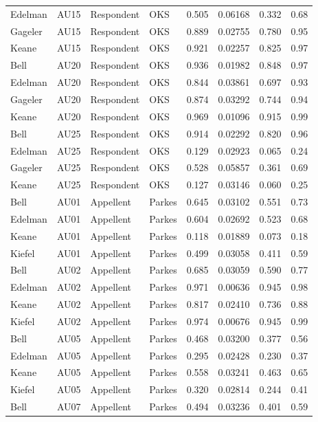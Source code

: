 \documentclass{monashthesis}
\begin{document}
\begin{center}
\begin{longtable}{llllllll}
Edelman & AU15 & Respondent & OKS & 0.505 & 0.06168 & 0.332 & 0.68 \\
Gageler & AU15 & Respondent & OKS & 0.889 & 0.02755 & 0.780 & 0.95 \\
Keane & AU15 & Respondent & OKS & 0.921 & 0.02257 & 0.825 & 0.97 \\
Bell & AU20 & Respondent & OKS & 0.936 & 0.01982 & 0.848 & 0.97 \\
Edelman & AU20 & Respondent & OKS & 0.844 & 0.03861 & 0.697 & 0.93 \\
Gageler & AU20 & Respondent & OKS & 0.874 & 0.03292 & 0.744 & 0.94 \\
Keane & AU20 & Respondent & OKS & 0.969 & 0.01096 & 0.915 & 0.99 \\
Bell & AU25 & Respondent & OKS & 0.914 & 0.02292 & 0.820 & 0.96 \\
Edelman & AU25 & Respondent & OKS & 0.129 & 0.02923 & 0.065 & 0.24 \\
Gageler & AU25 & Respondent & OKS & 0.528 & 0.05857 & 0.361 & 0.69 \\
Keane & AU25 & Respondent & OKS & 0.127 & 0.03146 & 0.060 & 0.25 \\
Bell & AU01 & Appellent & Parkes & 0.645 & 0.03102 & 0.551 & 0.73 \\
Edelman & AU01 & Appellent & Parkes & 0.604 & 0.02692 & 0.523 & 0.68 \\
Keane & AU01 & Appellent & Parkes & 0.118 & 0.01889 & 0.073 & 0.18 \\
Kiefel & AU01 & Appellent & Parkes & 0.499 & 0.03058 & 0.411 & 0.59 \\
Bell & AU02 & Appellent & Parkes & 0.685 & 0.03059 & 0.590 & 0.77 \\
Edelman & AU02 & Appellent & Parkes & 0.971 & 0.00636 & 0.945 & 0.98 \\
Keane & AU02 & Appellent & Parkes & 0.817 & 0.02410 & 0.736 & 0.88 \\
Kiefel & AU02 & Appellent & Parkes & 0.974 & 0.00676 & 0.945 & 0.99 \\
Bell & AU05 & Appellent & Parkes & 0.468 & 0.03200 & 0.377 & 0.56 \\
Edelman & AU05 & Appellent & Parkes & 0.295 & 0.02428 & 0.230 & 0.37 \\
Keane & AU05 & Appellent & Parkes & 0.558 & 0.03241 & 0.463 & 0.65 \\
Kiefel & AU05 & Appellent & Parkes & 0.320 & 0.02814 & 0.244 & 0.41 \\
Bell & AU07 & Appellent & Parkes & 0.494 & 0.03236 & 0.401 & 0.59 \\

\end{longtable}
\end{center}
\end{document}

